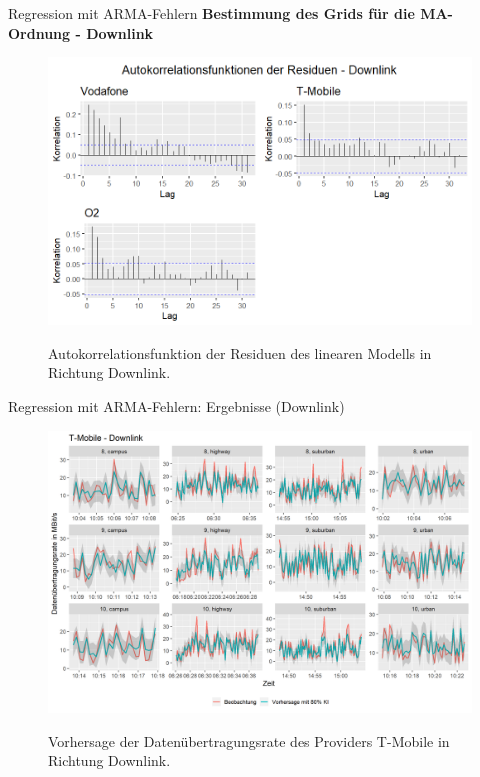 \begin{frame}{Regression mit ARMA-Fehlern}
	\textbf{Bestimmung des Grids für die MA-Ordnung - Downlink}
	\begin{figure}
		\includegraphics[scale=0.38]{plots/arima/downlink/res_acf}\\
		\caption{Autokorrelationsfunktion der Residuen des linearen Modells in Richtung Downlink.}
		\label{res_acf_dl}
	\end{figure}	
\end{frame}

\begin{frame}{Regression mit ARMA-Fehlern: Ergebnisse (Downlink)}
	\begin{figure}
		\centering
		\includegraphics[scale=0.38]{plots/arima/downlink/tmobile_predictions}\\
		\caption{Vorhersage der Datenübertragungsrate des Providers T-Mobile in Richtung Downlink.}
		\label{tmobile_predictions_dl}
	\end{figure}
\end{frame}